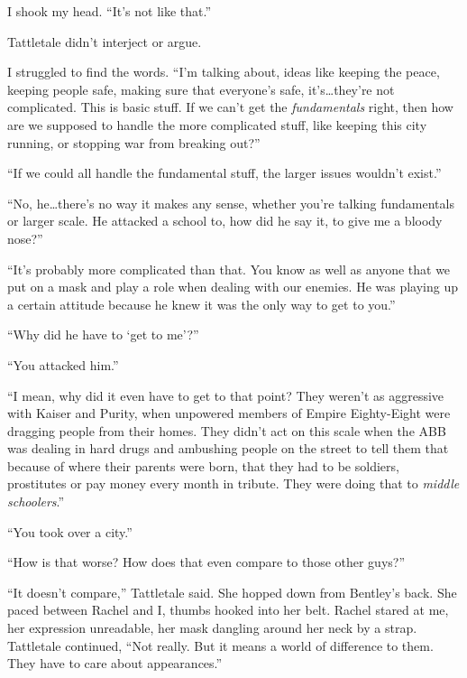 I shook my head.  ``It's not like that.''



Tattletale didn't interject or argue.



I struggled to find the words.  ``\ldotsWhat I'm talking about, ideas like keeping the peace, keeping people safe, making sure that everyone's safe, it's\ldots they're not complicated.  This is basic stuff.  If we can't get the \emph{fundamentals }right, then how are we supposed to handle the more complicated stuff, like keeping this city running, or stopping war from breaking out?''



``If we could all handle the fundamental stuff, the larger issues wouldn't exist.''



``No, he\ldots there's no way it makes any sense, whether you're talking fundamentals or larger scale.  He attacked a school to, how did he say it, to give me a bloody nose?''



``It's probably more complicated than that.  You know as well as anyone that we put on a mask and play a role when dealing with our enemies.  He was playing up a certain attitude because he knew it was the only way to get to you.''



``Why did he have to `get to me'?''



``You attacked him.''



``I mean, why did it even have to get to that point?  They weren't as aggressive with Kaiser and Purity, when unpowered members of Empire Eighty-Eight were dragging people from their homes.  They didn't act on this scale when the ABB was dealing in hard drugs and ambushing people on the street to tell them that because of where their parents were born, that they had to be soldiers, prostitutes or pay money every month in tribute.  They were doing that to \emph{middle schoolers}.''



``You took over a city.''



``How is that worse?  How does that even compare to those other guys?''



``It doesn't compare,'' Tattletale said.  She hopped down from Bentley's back.  She paced between Rachel and I, thumbs hooked into her belt.  Rachel stared at me, her expression unreadable, her mask dangling around her neck by a strap.  Tattletale continued, ``Not really.  But it means a world of difference to them.  They have to care about appearances.''



